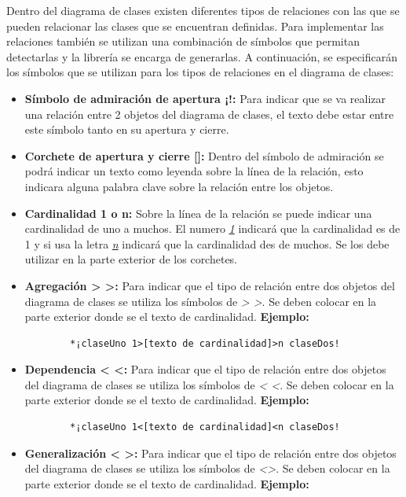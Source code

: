 Dentro del diagrama de clases existen diferentes tipos de relaciones con las que se pueden relacionar las clases que se encuentran definidas. Para implementar las relaciones también se utilizan una combinación de símbolos que permitan detectarlas y la librería se encarga de generarlas. A continuación, se especificarán los símbolos que se utilizan para los tipos de relaciones en el diagrama de clases:

\begin{itemize}
	\item \textbf{Símbolo de admiración de apertura ¡!:} Para indicar que se va realizar una relación entre 2 objetos del diagrama de clases, el texto debe estar entre este símbolo tanto en su apertura y cierre.
	
	\item \textbf{Corchete de apertura y cierre []:} Dentro del símbolo de admiración se podrá indicar un texto como leyenda sobre la línea de la relación, esto indicara alguna palabra clave sobre la relación entre los objetos.
	
	\item \textbf{Cardinalidad 1 o n:} Sobre la línea de la relación se puede indicar una cardinalidad de uno a muchos. El numero \textit{\underline{1}} indicará que la cardinalidad es de 1 y si usa la letra \textit{\underline{n}} indicará que la cardinalidad des de muchos. Se los debe utilizar en la parte exterior de los corchetes.
	
	\item \textbf{Agregación > >:} Para indicar que el tipo de relación entre dos objetos del diagrama de clases se utiliza los símbolos de \textit{> >}. Se deben colocar en la parte exterior donde se el texto de cardinalidad. \textbf{Ejemplo:}
	
	
	\begin{verbatim}
		*¡claseUno 1>[texto de cardinalidad]>n claseDos!
	\end{verbatim}

	\item \textbf{Dependencia < <:} Para indicar que el tipo de relación entre dos objetos del diagrama de clases se utiliza los símbolos de \textit{< <}. Se deben colocar en la parte exterior donde se el texto de cardinalidad. \textbf{Ejemplo:}
	
	\begin{verbatim}
		*¡claseUno 1<[texto de cardinalidad]<n claseDos!
	\end{verbatim}

	\item \textbf{Generalización < >:} Para indicar que el tipo de relación entre dos objetos del diagrama de clases se utiliza los símbolos de \textit{<>}. Se deben colocar en la parte exterior donde se el texto de cardinalidad. \textbf{Ejemplo:}
	

\end{itemize}
